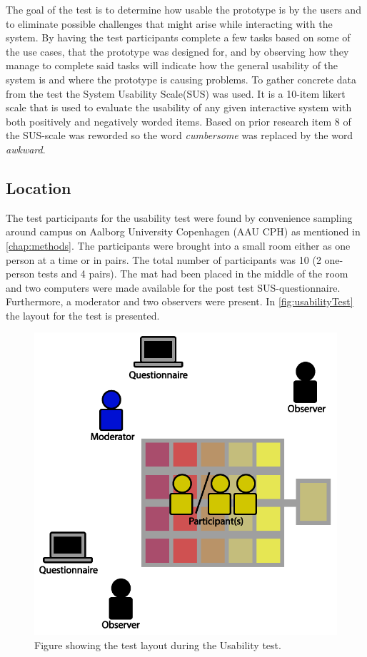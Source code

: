 The goal of the test is to determine how usable the prototype is by the users and to eliminate possible challenges that might arise while interacting with the system. By having the test participants complete a few tasks based on some of the use cases, that the prototype was designed for, and by observing how they manage to complete said tasks will indicate how the general usability of the system is and where the prototype is causing problems. To gather concrete data from the test the System Usability Scale(SUS)\cite{susScale} was used. It is a 10-item likert scale that is used to evaluate the usability of any given interactive system with both positively and negatively worded items. Based on prior research item 8 of the SUS-scale was reworded so the word \textit{cumbersome} was replaced by the word \textit{awkward}\cite{susScale}.


\subsection{Location}
The test participants for the usability test were found by convenience sampling around campus on Aalborg University Copenhagen (AAU CPH) as mentioned in \ref{chap:methods}. The participants were brought into a small room either as one person at a time or in pairs. The total number of participants was 10 (2 one-person tests and 4 pairs). The mat had been placed in the middle of the room and two computers were made available for the post test SUS-questionnaire. Furthermore, a moderator and two observers were present. In \autoref{fig:usabilityTest} the layout for the test is presented.

\begin{figure}[H]
	\centering
	\includegraphics[width=0.7\linewidth]{figure/Design/usability}
	\caption{Figure showing the test layout during the Usability test.}	
	\label{fig:usabilityTest}
\end{figure}

